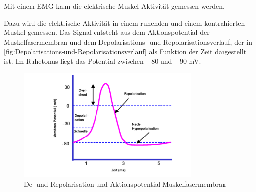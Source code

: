 Mit einem EMG kann die elektrische Muskel-Aktivität gemessen werden.

Dazu wird die elektrische Aktivität in einem ruhenden und einem kontrahierten Muskel gemessen. Das Signal entsteht aus dem Aktionspotential der Muskelfasermembran und dem Depolarisations- und Repolarisationsverlauf, der in \autoref{fig:Depolarisations-und-Repolarisationsverlauf} als Funktion der Zeit dargestellt ist. Im Ruhetonus liegt das Potential zwischen $-80$ und  $-90$ mV.

\begin{figure}[h!]
    \centering
    \includegraphics[width=0.8\textwidth]{img/De-Repolarisation.PNG}
    \caption{De- und Repolarisation und Aktionspotential Muskelfasermembran \cite{Vorlesung-Muskulatur-EMG}}
    \label{fig:depolarisations-und-repolarisationsverlauf}
\end{figure}

